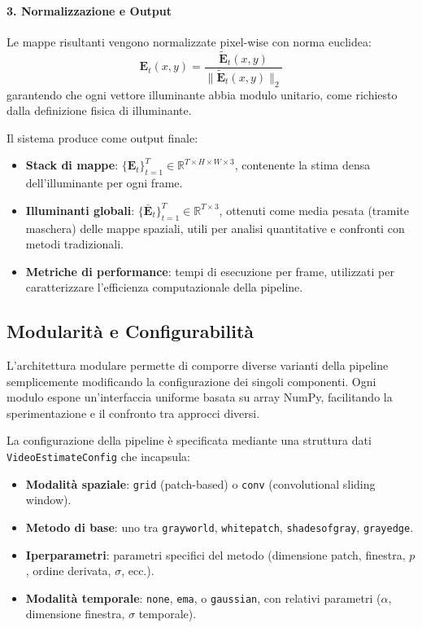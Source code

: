 \paragraph{3. Normalizzazione e Output}
Le mappe risultanti vengono normalizzate pixel-wise con norma euclidea:
\begin{equation}
    \mathbf{E}_t(x,y) = \frac{\tilde{\mathbf{E}}_t(x,y)}{\|\tilde{\mathbf{E}}_t(x,y)\|_2}
    \label{eq:l2_normalization}
\end{equation}
garantendo che ogni vettore illuminante abbia modulo unitario, come richiesto dalla definizione fisica di illuminante.

Il sistema produce come output finale:
\begin{itemize}
    \item \textbf{Stack di mappe}: $\{\mathbf{E}_t\}_{t=1}^T \in \mathbb{R}^{T \times H \times W \times 3}$, contenente la stima densa dell'illuminante per ogni frame.
    \item \textbf{Illuminanti globali}: $\{\bar{\mathbf{E}}_t\}_{t=1}^T \in \mathbb{R}^{T \times 3}$, ottenuti come media pesata (tramite maschera) delle mappe spaziali, utili per analisi quantitative e confronti con metodi tradizionali.
    \item \textbf{Metriche di performance}: tempi di esecuzione per frame, utilizzati per caratterizzare l'efficienza computazionale della pipeline.
\end{itemize}

\subsection{Modularità e Configurabilità}
L'architettura modulare permette di comporre diverse varianti della pipeline semplicemente modificando la configurazione dei singoli componenti. Ogni modulo espone un'interfaccia uniforme basata su array NumPy, facilitando la sperimentazione e il confronto tra approcci diversi.

La configurazione della pipeline è specificata mediante una struttura dati \texttt{VideoEstimateConfig} che incapsula:
\begin{itemize}
    \item \textbf{Modalità spaziale}: \texttt{grid} (patch-based) o \texttt{conv} (convolutional sliding window).
    \item \textbf{Metodo di base}: uno tra \texttt{grayworld}, \texttt{whitepatch}, \texttt{shadesofgray}, \texttt{grayedge}.
    \item \textbf{Iperparametri}: parametri specifici del metodo (dimensione patch, finestra, $p$, ordine derivata, $\sigma$, ecc.).
    \item \textbf{Modalità temporale}: \texttt{none}, \texttt{ema}, o \texttt{gaussian}, con relativi parametri ($\alpha$, dimensione finestra, $\sigma$ temporale).
\end{itemize}

